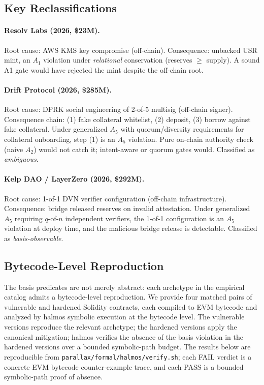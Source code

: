 \documentclass[11pt,a4paper]{article}
\begin{document}
\subsection{Key Reclassifications}

\paragraph{Resolv Labs (2026, \$23M).} Root cause: AWS KMS key compromise (off-chain). Consequence: unbacked USR mint, an $A_1$ violation under \emph{relational} conservation (reserves $\geq$ supply). A sound A1 gate would have rejected the mint despite the off-chain root.

\paragraph{Drift Protocol (2026, \$285M).} Root cause: DPRK social engineering of 2-of-5 multisig (off-chain signer). Consequence chain: (1) fake collateral whitelist, (2) deposit, (3) borrow against fake collateral. Under generalized $A_5$ with quorum/diversity requirements for collateral onboarding, step (1) is an $A_5$ violation. Pure on-chain authority check (naive $A_2$) would not catch it; intent-aware or quorum gates would. Classified as \emph{ambiguous}.

\paragraph{Kelp DAO / LayerZero (2026, \$292M).} Root cause: 1-of-1 DVN verifier configuration (off-chain infrastructure). Consequence: bridge released reserves on invalid attestation. Under generalized $A_5$ requiring $q$-of-$n$ independent verifiers, the 1-of-1 configuration is an $A_5$ violation at deploy time, and the malicious bridge release is detectable. Classified as \emph{basis-observable}.

\subsection{Bytecode-Level Reproduction}\label{sec:bytecode-repro}

The basis predicates are not merely abstract: each archetype in the empirical catalog admits a bytecode-level reproduction. We provide four matched pairs of vulnerable and hardened Solidity contracts, each compiled to EVM bytecode and analyzed by halmos symbolic execution at the bytecode level. The vulnerable versions reproduce the relevant archetype; the hardened versions apply the canonical mitigation; halmos verifies the absence of the basis violation in the hardened versions over a bounded symbolic-path budget. The results below are reproducible from \texttt{parallax/formal/halmos/verify.sh}; each FAIL verdict is a concrete EVM bytecode counter-example trace, and each PASS is a bounded symbolic-path proof of absence.
\end{document}
